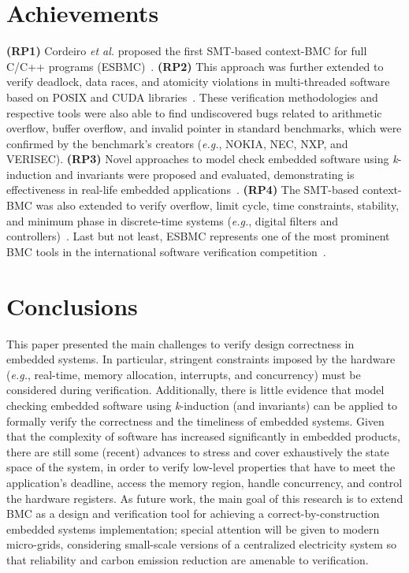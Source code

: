 \documentclass{acm_sen_article}
\begin{document}
\section{Achievements}
\label{achievements}

\textbf{(RP1)} Cordeiro {\it et al.} proposed the first SMT-based context-BMC for full C/C++ programs (ESBMC)~\cite{Cordeiro12,ECBS13}. \textbf{(RP2)} This approach was further extended to verify deadlock, data races, and atomicity violations in multi-threaded software based on POSIX and CUDA libraries~\cite{CordeiroF11,Pereira15}. These verification methodologies and respective tools were also able to find undiscovered bugs related to arithmetic overflow, buffer overflow, and invalid pointer in standard benchmarks, which were confirmed by the benchmark's creators ({\it e.g.}, NOKIA, NEC, NXP, and VERISEC). \textbf{(RP3)} Novel approaches to model check embedded software using \textit{k}-induction and invariants were proposed and evaluated, demonstrating is effectiveness in real-life embedded applications~\cite{Gadelha15,Rocha15}. \textbf{(RP4)} The SMT-based context-BMC was also extended to verify overflow, limit cycle, time constraints, stability, and minimum phase in discrete-time systems ({\it e.g.}, digital filters and controllers)~\cite{dsv_spin2015,esbmc_controller,esbmc_filter}.  Last but not least, ESBMC represents one of the most prominent BMC tools in the international software verification competition~\cite{MorseCNF13,MorseRCN014}.

\section{Conclusions}
\label{conclusions}

This paper presented the main challenges to verify design correctness in embedded systems. In particular, stringent constraints imposed by the hardware ({\it e.g.}, real-time, memory allocation, interrupts, and concurrency) must be considered during verification. Additionally, there is little evidence that model checking embedded software using \textit{k}-induction (and invariants) can be applied to formally verify the correctness and the timeliness of embedded systems. Given that the complexity of software has increased significantly in embedded products, there are still some (recent) advances to stress and cover exhaustively the state space of the system, in order to verify low-level properties that have to meet the application's deadline, access the memory region, handle concurrency, and control the hardware registers. As future work, the main goal of this research is to extend BMC as a design and verification tool for achieving a correct-by-construction embedded systems implementation; special attention will be given to modern micro-grids, considering small-scale versions of a centralized electricity system so that reliability and carbon emission reduction are amenable to verification.
\end{document}
